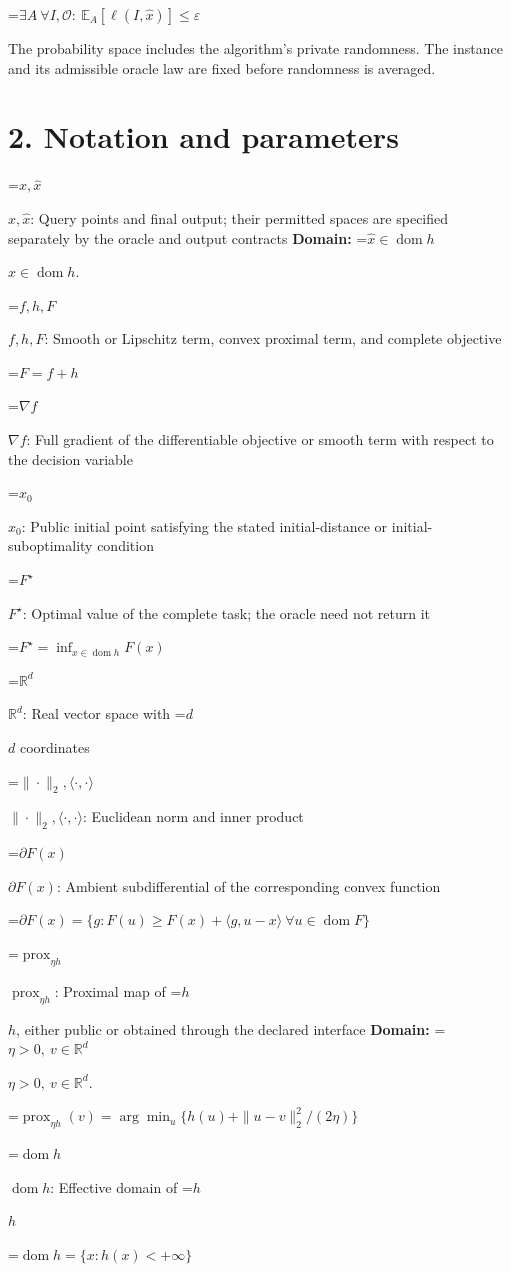 \documentclass[10pt,a4paper]{article}
\newcommand{\AtlasMath}[1]{\par\begingroup\centering\setbox0=\hbox{$\displaystyle #1$}\ifdim\wd0>1.4\linewidth\typeout{ATLAS WIDE FORMULA: \the\wd0}\fi\ifdim\wd0>\linewidth\resizebox{\linewidth}{!}{\box0}\else\box0\fi\par\endgroup}
\newcommand{\AtlasInlineMath}[1]{\begingroup\setbox0=\hbox{$#1$}\ifdim\wd0>.4\linewidth\endgroup\AtlasMath{#1}\else\endgroup$#1$\fi}
\begin{document}
\AtlasMath{\exists A\ \forall I,\mathcal{O}:\ \mathbb{E}_A[\ell(I,\widehat{x})]\le\varepsilon}


The probability space includes the algorithm's private randomness. The instance and its admissible oracle law are fixed before randomness is averaged.

\section{2. Notation and parameters}
\AtlasInlineMath{x,\widehat{x}}: Query points and final output; their permitted spaces are specified separately by the oracle and output contracts \textbf{Domain:} \AtlasInlineMath{\widehat{x}\in \operatorname{dom}h}.

\AtlasInlineMath{f,h,F}: Smooth or Lipschitz term, convex proximal term, and complete objective


\AtlasMath{F=f+h}


\AtlasInlineMath{\nabla f}: Full gradient of the differentiable objective or smooth term with respect to the decision variable

\AtlasInlineMath{x_0}: Public initial point satisfying the stated initial-distance or initial-suboptimality condition

\AtlasInlineMath{F^\star}: Optimal value of the complete task; the oracle need not return it


\AtlasMath{F^\star=\inf_{x\in \operatorname{dom}h}F(x)}


\AtlasInlineMath{\mathbb{R}^d}: Real vector space with \AtlasInlineMath{d} coordinates

\AtlasInlineMath{\|\cdot\|_2,\langle\cdot,\cdot\rangle}: Euclidean norm and inner product

\AtlasInlineMath{\partial F(x)}: Ambient subdifferential of the corresponding convex function


\AtlasMath{\partial F(x)=\{g:F(u)\ge F(x)+\langle g,u-x\rangle\ \forall u\in\operatorname{dom}F\}}


\AtlasInlineMath{\operatorname{prox}_{\eta h}}: Proximal map of \AtlasInlineMath{h}, either public or obtained through the declared interface \textbf{Domain:} \AtlasInlineMath{\eta>0,\ v\in\mathbb{R}^d}.


\AtlasMath{\operatorname{prox}_{\eta h}(v)=\arg\min_u\{h(u)+\|u-v\|_2^2/(2\eta)\}}


\AtlasInlineMath{\operatorname{dom}h}: Effective domain of \AtlasInlineMath{h}


\AtlasMath{\operatorname{dom}h=\{x:h(x)<+\infty\}}
\end{document}
